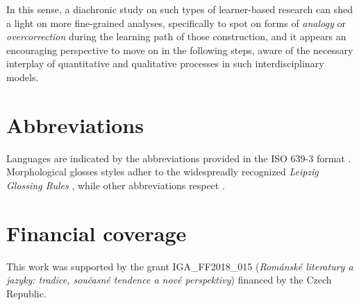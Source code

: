 \documentclass[a4paper,twoside,12pt,chapterprefix=false,listof=flat]{scrartcl}
\theoremstyle{plain} %
\theoremstyle{definition}
\theoremstyle{remark}
\begin{document}
In this sense, a diachronic study on such types of learner-based
research can shed a light on more fine-grained analyses, specifically to
spot on forms of \emph{analogy} or \emph{overcorrection} during the
learning path of those construction, and it appears an encouraging
perspective to move on in the following steps, aware of the necessary
interplay of quantitative and qualitative processes in such
interdisciplinary models.

\hypertarget{abbreviations}{%
\section*{Abbreviations}\label{abbreviations}}

Languages are indicated by the abbreviations provided in the ISO 639-3
format \citep{iso639-3}. Morphological glosses styles adher to the
widespreadly recognized \emph{Leipzig Glossing Rules}
\citep{leipzigGlossingRules}, while other abbreviations respect
\citep{boeckxListOfAbbreviations}.

\hypertarget{financial-coverage}{%
\section*{Financial coverage}\label{financial-coverage}}

This work was supported by the grant IGA\_FF2018\_015 (\emph{Románské
literatury a jazyky: tradice, současné tendence a nové perspektivy})
financed by the Czech Republic.


\end{document}

